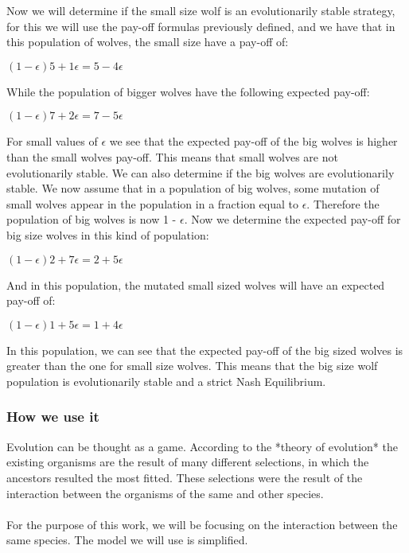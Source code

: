\documentclass{article}
\begin{document}
Now we will determine if the small size wolf is an evolutionarily stable strategy, for this we will use the pay-off formulas previously defined, and we have that in this population of wolves, the small size have a pay-off of:
\begin{center}
$(1-{\epsilon})5 + 1{\epsilon} = 5 - 4{\epsilon}$
\end{center}
While the population of bigger wolves have the following expected pay-off:
\begin{center}
$(1-{\epsilon})7 + 2{\epsilon} = 7 - 5{\epsilon}$
\end{center}
For small values of $\epsilon$ we see that the expected pay-off of the big wolves is higher than the small wolves pay-off.  This means that small wolves are not evolutionarily stable.
We can also determine if the big wolves are evolutionarily stable. We now assume that in a population of big wolves, some mutation of small wolves appear in the population in a fraction equal to $\epsilon$. Therefore the population of big wolves is now 1 - $\epsilon$. Now we determine the expected pay-off for big size wolves in this kind of population:
 \begin{center}
$(1-{\epsilon})2 + 7{\epsilon} = 2 + 5{\epsilon}$
\end{center}
And in this population, the mutated small sized wolves will have an expected pay-off of:
\begin{center}
$(1-{\epsilon})1 + 5{\epsilon} = 1 + 4{\epsilon}$
\end{center}
In this population, we can see that the expected pay-off of the big sized wolves is greater than the one for small size wolves. This means that the big size wolf population is evolutionarily stable and a strict Nash Equilibrium.

\subsubsection{How we use it}
Evolution can be thought as a game. According to the *theory of evolution* the existing organisms are the result of many different selections, in which the ancestors resulted the most fitted. These selections were the result of the interaction between the organisms of the same and other species.
\\\\For the purpose of this work, we will be focusing on the interaction between the same species. The model we will use is simplified.
\end{document}
